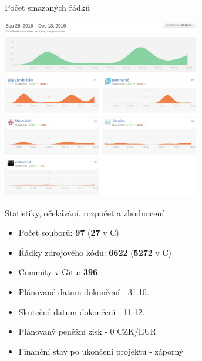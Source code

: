 \documentclass[13pt]{beamer}
\begin{document}
\begin{frame}{Počet smazaných řádků}
  \begin{center}
    \includegraphics[width=0.65\textwidth]{./img/git_del.pdf}
  \end{center}
\end{frame}

\begin{frame}{Statistiky, očekávání, rozpočet a zhodnocení}
\begin{itemize}
\item Počet souborů: \textbf{97} (\textbf{27} v C)
\item Řádky zdrojového kódu: \textbf{6622} (\textbf{5272} v C)
\item Commity v Gitu: \textbf{396}
\end{itemize}

\begin{itemize}
\item Plánované datum dokončení - 31.10.
\item Skutečné datum dokončení - 11.12.
\item Plánovaný peněžní zisk - 0 CZK/EUR
\item Finanční stav po ukončení projektu - záporný
\end{itemize}

\end{frame}
\end{document}
